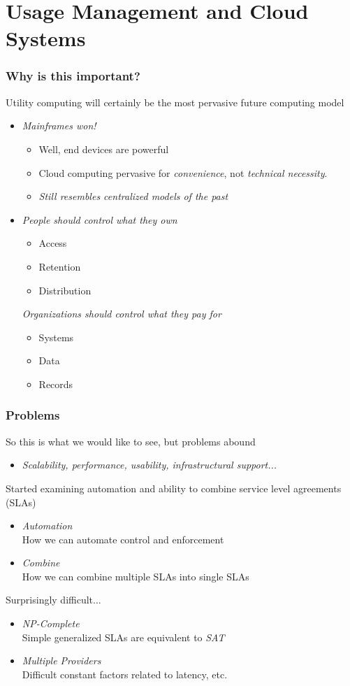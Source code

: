 \documentclass[t, 10pt]{beamer}
\begin{document}
\section{Usage Management and Cloud Systems}
\begin{frame}
\frametitle{Why is this important?}
Utility computing will certainly be the most pervasive future computing model \\
\pause
\begin{itemize}
\item \textit{Mainframes won!}
\pause
\begin{itemize}
\item Well, end devices are powerful
\item Cloud computing pervasive for \textit{convenience}, not \textit{technical necessity}.
\item \textit{Still resembles centralized models of the past}
\end{itemize}
\pause
\item \textit{People should control what they own}
\begin{itemize}
\item Access
\item Retention
\item Distribution
\end{itemize}
\pause \textit{Organizations should control what they pay for}
\begin{itemize}
\item Systems
\item Data
\item Records
\end{itemize}
\end{itemize}
\end{frame}

\begin{frame}
\frametitle{Problems}
So this is what we would like to see, but problems abound
\begin{itemize}
\item \textit{Scalability, performance, usability, infrastructural support...}
\end{itemize}
\pause

Started examining automation and ability to combine service level agreements (SLAs)
\begin{itemize}
\item \textit{Automation} \\
How we can automate control and enforcement
\item \textit{Combine} \\
How we can combine multiple SLAs into single SLAs
\end{itemize}
\pause

Surprisingly difficult...
\begin{itemize}
\item \textit{NP-Complete} \\
Simple generalized SLAs are equivalent to \textit{SAT}
\item \textit{Multiple Providers} \\
Difficult constant factors related to latency, etc.
\end{itemize}
 
\end{frame}
\end{document}
